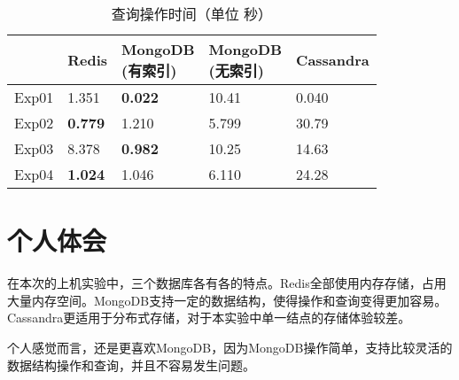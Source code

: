 \documentclass[12pt]{ctexart}
\begin{document}
\begin{table}
    \centering
    \caption{查询操作时间（单位 秒）\label{tab}}
	\begin{tabular}{|c|p{2.5cm}<{\centering}|p{2.5cm}<{\centering}|p{2.5cm}<{\centering}|p{2.5cm}<{\centering}|}
		\hline
		      & Redis & \makecell{MongoDB\\(有索引)} & \makecell{MongoDB\\(无索引)} & Cassandra \\
		\hline
		Exp01 & 1.351 & \textbf{0.022} & 10.41 & 0.040 \\
		Exp02 & \textbf{0.779} & 1.210 & 5.799 & 30.79 \\
		Exp03 & 8.378 & \textbf{0.982} & 10.25 & 14.63 \\
		Exp04 & \textbf{1.024} & 1.046 & 6.110 & 24.28 \\
		\hline
	\end{tabular}
\end{table}

\section{个人体会}

在本次的上机实验中，三个数据库各有各的特点。Redis全部使用内存存储，占用大量内存空间。MongoDB支持一定的数据结构，使得操作和查询变得更加容易。Cassandra更适用于分布式存储，对于本实验中单一结点的存储体验较差。

个人感觉而言，还是更喜欢MongoDB，因为MongoDB操作简单，支持比较灵活的数据结构操作和查询，并且不容易发生问题。
\end{document}
